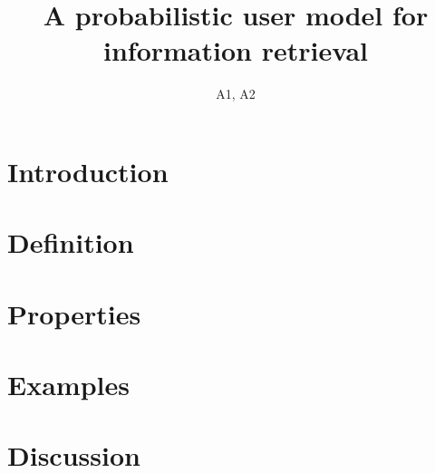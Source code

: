 \documentclass[10pt]{article}
\title{A probabilistic user model for information retrieval}
\author{A1, A2}
\date{}
\begin{document}
\maketitle
\section{Introduction}

\section{Definition}

\section{Properties}

\section{Examples}

\section{Discussion}
\end{document}
